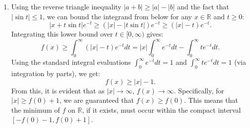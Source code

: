 \documentclass[10pt,a4paper]{article}
\begin{document}
\begin{enumerate}[label=\fbox{\arabic*}]
        \textbf{Finding $K_2$ in $G_2$:}
        We need a complement $K_2$ to $H_2 = \langle(1, 0)\rangle$ in $\mathbb{Z}_2 \times \mathbb{Z}_4$.
        Since $|G_2| = 8$ and $|H_2| = 2$, we need $|K_2| = 4$. Furthermore, $G_2 / H_2 \cong \mathbb{Z}_4$, so $K_2$ must be isomorphic to $\mathbb{Z}_4$.
        Thus, $K_2$ is generated by an element of order $4$, which must be of the form $(x, y)$ where $y \in \{1, 3\}$.
        If $y = 1$, the generator is either $(0, 1)$ or $(1, 1)$. 
        \begin{itemize}
          \item $\langle (0, 1) \rangle = \{(0,0), (0,1), (0,2), (0,3)\}$. Its intersection with $H_2$ is $\{(0,0)\}$.
          \item $\langle (1, 1) \rangle = \{(0,0), (1,1), (0,2), (1,3)\}$. Its intersection with $H_2$ is $\{(0,0)\}$.
        \end{itemize}
        The generators $(0,3)$ and $(1,3)$ generate the exact same two subgroups. Thus, there are exactly $2$ valid choices for $K_2$.

        \textbf{Finding $K_3$ in $G_3$:}
        We need a complement $K_3$ to $H_3 = \langle(1, 0)\rangle$ in $\mathbb{Z}_3 \times \mathbb{Z}_3$.
        This is a vector space of dimension $2$ over the field $\mathbb{F}_3$. $H_3$ is a $1$-dimensional subspace, and we need another $1$-dimensional subspace $K_3$ such that they span the whole space.
        The total number of $1$-dimensional subspaces in $\mathbb{F}_3^2$ is $\frac{3^2 - 1}{3 - 1} = 4$.
        One of them is $H_3$. The remaining $3$ subspaces are valid complements (they are generated by $(0,1), (1,1)$, and $(2,1)$). Thus, there are exactly $3$ valid choices for $K_3$.

        The total number of such subgroups $K$ is the product of the number of choices for $K_2$ and $K_3$, which is $2 \times 3 = 6$.

  \item %
        Using the reverse triangle inequality $|a + b| \ge |a| - |b|$ and the fact that $|\sin t| \le 1$, we can bound the integrand from below for any $x \in \mathbb{R}$ and $t \ge 0$:
        \[
          |x + t \sin t| e^{-t} \ge (|x| - |t \sin t|) e^{-t} \ge (|x| - t) e^{-t}.
        \]
        Integrating this lower bound over $t \in [0, \infty)$ gives:
        \[
          f(x) \ge \int_0^\infty (|x| - t) e^{-t} dt = |x| \int_0^\infty e^{-t} dt - \int_0^\infty t e^{-t} dt.
        \]
        Using the standard integral evaluations $\int_0^\infty e^{-t} dt = 1$ and $\int_0^\infty t e^{-t} dt = 1$ (via integration by parts), we get:
        \[
          f(x) \ge |x| - 1.
        \]
        From this, it is evident that as $|x| \to \infty$, $f(x) \to \infty$. Specifically, for $|x| \ge f(0) + 1$, we are guaranteed that $f(x) \ge f(0)$. This means that the minimum of $f$ on $\mathbb{R}$, if it exists, must occur within the compact interval $[-f(0)-1, f(0)+1]$.


\end{enumerate}
\end{document}
